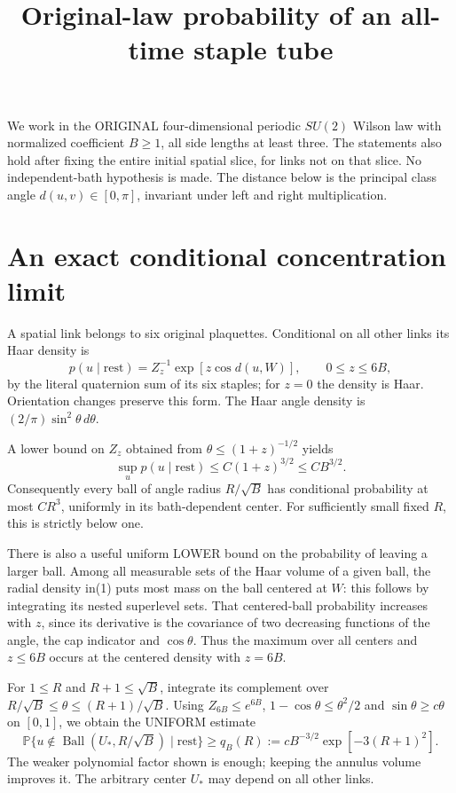 \documentclass{article}
\title{Original-law probability of an all-time staple tube}\author{}\date{}
\begin{document}
\maketitle
We work in the ORIGINAL four-dimensional periodic $SU(2)$ Wilson law with normalized coefficient $B\ge1$, all side lengths at least three. The statements also hold after fixing the entire initial spatial slice, for links not on that slice. No independent-bath hypothesis is made. The distance below is the principal class angle $d(u,v)\in[0,\pi]$, invariant under left and right multiplication.

\section*{An exact conditional concentration limit}
A spatial link belongs to six original plaquettes. Conditional on all other links its Haar density is
\[
 p(u\mid\mathrm{rest})=Z_z^{-1}\exp[z\cos d(u,W)],\qquad0\le z\le6B,                 \tag{1}
\]
by the literal quaternion sum of its six staples; for $z=0$ the density is Haar. Orientation changes preserve this form. The Haar angle density is $(2/\pi)\sin^2\theta\,d\theta$.

A lower bound on $Z_z$ obtained from $\theta\le(1+z)^{-1/2}$ yields
\[
 \sup_u p(u\mid\mathrm{rest})\le C(1+z)^{3/2}\le C B^{3/2}.                        \tag{2}
\]
Consequently every ball of angle radius $R/\sqrt B$ has conditional probability at most $CR^3$, uniformly in its bath-dependent center. For sufficiently small fixed $R$, this is strictly below one.

There is also a useful uniform LOWER bound on the probability of leaving a larger ball. Among all measurable sets of the Haar volume of a given ball, the radial density in(1) puts most mass on the ball centered at $W$: this follows by integrating its nested superlevel sets. That centered-ball probability increases with $z$, since its derivative is the covariance of two decreasing functions of the angle, the cap indicator and $\cos\theta$. Thus the maximum over all centers and $z\le6B$ occurs at the centered density with $z=6B$.

For $1\le R$ and $R+1\le\sqrt B$, integrate its complement over
$R/\sqrt B\le\theta\le(R+1)/\sqrt B$. Using $Z_{6B}\le e^{6B}$, $1-\cos\theta\le\theta^2/2$ and $\sin\theta\ge c\theta$ on $[0,1]$, we obtain the UNIFORM estimate
\[
 \mathbb P\{u\notin\operatorname{Ball}(U_*,R/\sqrt B)\mid\mathrm{rest}\}
 \ge q_B(R):=c B^{-3/2}\exp[-3(R+1)^2].               \tag{3}
\]
The weaker polynomial factor shown is enough; keeping the annulus volume improves it. The arbitrary center $U_*$ may depend on all other links.
\end{document}
